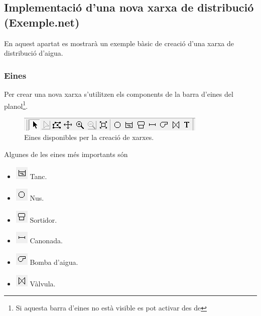 \documentclass[12pt]{article}
\begin{document}
\clearpage
\subsection{Implementació d'una nova xarxa de distribució (Exemple.net)\label{xarxaEPANET}}
En aquest apartat es mostrarà un exemple bàsic de creació d'una xarxa de distribució d'aigua.
\subsubsection{Eines}
Per crear una nova xarxa s'utilitzen els components de la barra d'eines del planol\footnote{Si aquesta barra d'eines no està visible es pot activar des de }.
\begin{figure}[h!]
	\centering
	\includegraphics[scale=1]{imatges/epanet/4.png}
	\caption{Eines disponibles per la creació de xarxes.}
\end{figure}
Algunes de les eines més importants són
\begin{itemize}
	\item[] \includegraphics{imatges/epanet/4_1.png} Tanc.
	\item[] \includegraphics{imatges/epanet/4_2.png} Nus.
	\item[] \includegraphics{imatges/epanet/4_3.png} Sortidor.
	\item[] \includegraphics{imatges/epanet/4_4.png} Canonada.
	\item[] \includegraphics{imatges/epanet/4_5.png} Bomba d'aigua.
	\item[] \includegraphics{imatges/epanet/4_6.png} Vàlvula.
\end{itemize}
\end{document}
